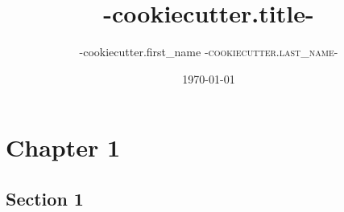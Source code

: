 \documentclass[fontsize=10pt, paper=a4, oneside, openright, twocolumn]{book}
\title{ {{-cookiecutter.title-}} }
\date{\today}
\author{ {{-cookiecutter.first_name}} \textsc{ {{-cookiecutter.last_name-}} } }
\begin{document}

\maketitle

\newpage

\tableofcontents

\newpage


\newpage


\chapter{Chapter 1}
\section{Section 1}
\end{document}
